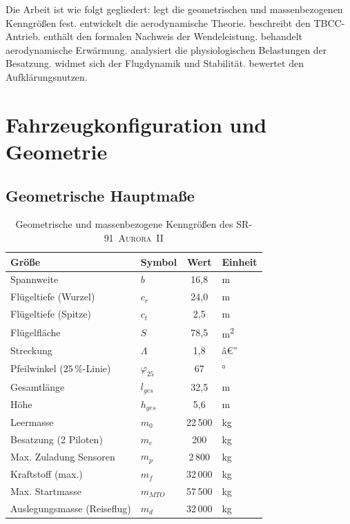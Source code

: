 ﻿\documentclass[12pt,a4paper]{article}
\theoremstyle{plain}
\theoremstyle{definition}
\theoremstyle{remark}
\newcommand{\SR}{\textsc{SR-91~Aurora~II}}
\begin{document}
Die Arbeit ist wie folgt gegliedert:
 legt die geometrischen und massenbezogenen Kenngrößen fest.
 entwickelt die aerodynamische Theorie.
 beschreibt den TBCC-Antrieb.
 enthält den formalen Nachweis der Wendeleistung.
 behandelt aerodynamische Erwärmung.
 analysiert die physiologischen Belastungen der Besatzung.
 widmet sich der Flugdynamik und Stabilität.
 bewertet den Aufklärungsnutzen.

\section{Fahrzeugkonfiguration und Geometrie}
\label{sec:config}

\subsection{Geometrische Hauptmaße}

\begin{table}[H]
\centering
\caption{Geometrische und massenbezogene Kenngrößen des \SR{}}
\label{tab:geo}
\begin{tabular}{llcl}
\toprule
Größe & Symbol & Wert & Einheit \\
\midrule
Spannweite & $b$ & 16{,}8 & \si{\metre} \\
Flügeltiefe (Wurzel) & $c_r$ & 24{,}0 & \si{\metre} \\
Flügeltiefe (Spitze) & $c_t$ & 2{,}5 & \si{\metre} \\
Flügelfläche & $S$ & 78{,}5 & \si{\metre\squared} \\
Streckung & $\Lambda$ & 1{,}8 & â€” \\
Pfeilwinkel ($25\,\%$-Linie) & $\varphi_{25}$ & 67 & \si{\degree} \\
Gesamtlänge & $l_{ges}$ & 32{,}5 & \si{\metre} \\
Höhe & $h_{ges}$ & 5{,}6 & \si{\metre} \\
\midrule
Leermasse & $m_0$ & 22\,500 & \si{\kilo\gram} \\
Besatzung (2 Piloten) & $m_c$ & 200 & \si{\kilo\gram} \\
Max. Zuladung Sensoren & $m_p$ & 2\,800 & \si{\kilo\gram} \\
Kraftstoff (max.) & $m_f$ & 32\,000 & \si{\kilo\gram} \\
Max. Startmasse & $m_{MTO}$ & 57\,500 & \si{\kilo\gram} \\
Auslegungsmasse (Reiseflug) & $m_d$ & 32\,000 & \si{\kilo\gram} \\
\bottomrule
\end{tabular}
\end{table}
\end{document}
